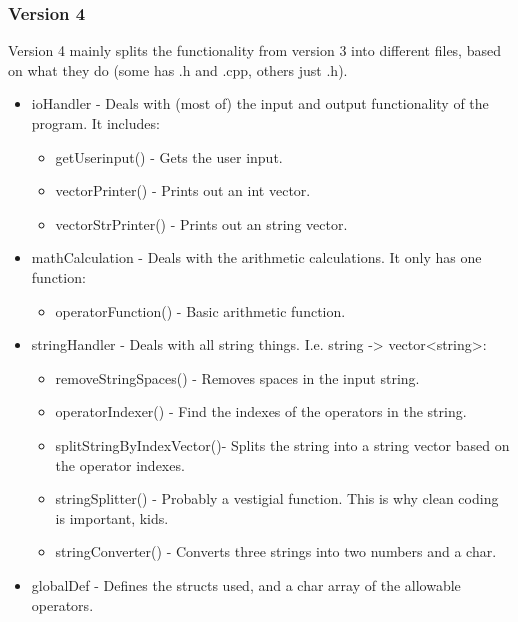 \documentclass{article}
\begin{document}
			\subsubsection{Version 4}
				Version 4 mainly splits the functionality from version 3 into different files, based on what they do (some has .h and .cpp, others just .h).
				\begin{itemize}
					\item ioHandler 		- Deals with (most of) the input and output functionality of the program. It includes:
					\begin{itemize}
						\item getUserinput()			- Gets the user input.
						\item vectorPrinter()			- Prints out an int vector.
						\item vectorStrPrinter() 		- Prints out an string vector.
					\end{itemize}
				
					\item mathCalculation 	- Deals with the arithmetic calculations. It only has one function:
					\begin{itemize}
						\item operatorFunction()		- Basic arithmetic function.
					\end{itemize}
				
					\item stringHandler 	- Deals with all string things. I.e. string -> vector<string>:
					\begin{itemize}
						\item removeStringSpaces()		- Removes spaces in the input string.
						\item operatorIndexer()			- Find the indexes of the operators in the string.
						\item splitStringByIndexVector()- Splits the string into a string vector based on the operator indexes.
						\item stringSplitter()			- Probably a vestigial function. This is why clean coding is important, kids.
						\item stringConverter()			- Converts three strings into two numbers and a char.
					\end{itemize}
				
					\item globalDef			- Defines the structs used, and a char array of the allowable operators.
				\end{itemize}
		
\end{document}

